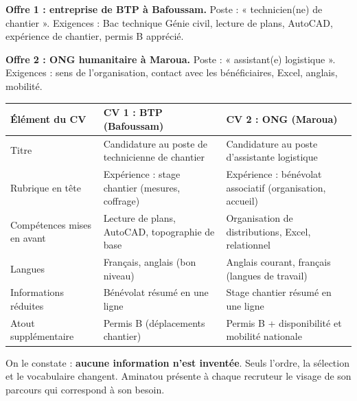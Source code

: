 \documentclass[11pt]{article}
\begin{document}
\textbf{Offre 1 : entreprise de BTP à Bafoussam.} Poste : « technicien(ne) de chantier ». Exigences : Bac technique Génie civil, lecture de plans, AutoCAD, expérience de chantier, permis B apprécié.

\textbf{Offre 2 : ONG humanitaire à Maroua.} Poste : « assistant(e) logistique ». Exigences : sens de l'organisation, contact avec les bénéficiaires, Excel, anglais, mobilité.

\begin{center}
\begin{tabularx}{\linewidth}{|l|X|X|}
\hline
\rowcolor{popblueL} \textbf{Élément du CV} & \textbf{CV 1 : BTP (Bafoussam)} & \textbf{CV 2 : ONG (Maroua)} \\
\hline
Titre & Candidature au poste de technicienne de chantier & Candidature au poste d'assistante logistique \\
\hline
Rubrique en tête & Expérience : stage chantier (mesures, coffrage) & Expérience : bénévolat associatif (organisation, accueil) \\
\hline
Compétences mises en avant & Lecture de plans, AutoCAD, topographie de base & Organisation de distributions, Excel, relationnel \\
\hline
Langues & Français, anglais (bon niveau) & Anglais courant, français (langues de travail) \\
\hline
Informations réduites & Bénévolat résumé en une ligne & Stage chantier résumé en une ligne \\
\hline
Atout supplémentaire & Permis B (déplacements chantier) & Permis B + disponibilité et mobilité nationale \\
\hline
\end{tabularx}
\end{center}

On le constate : \textbf{aucune information n'est inventée}. Seuls l'ordre, la sélection et le vocabulaire changent. Aminatou présente à chaque recruteur le visage de son parcours qui correspond à son besoin.
\end{document}
